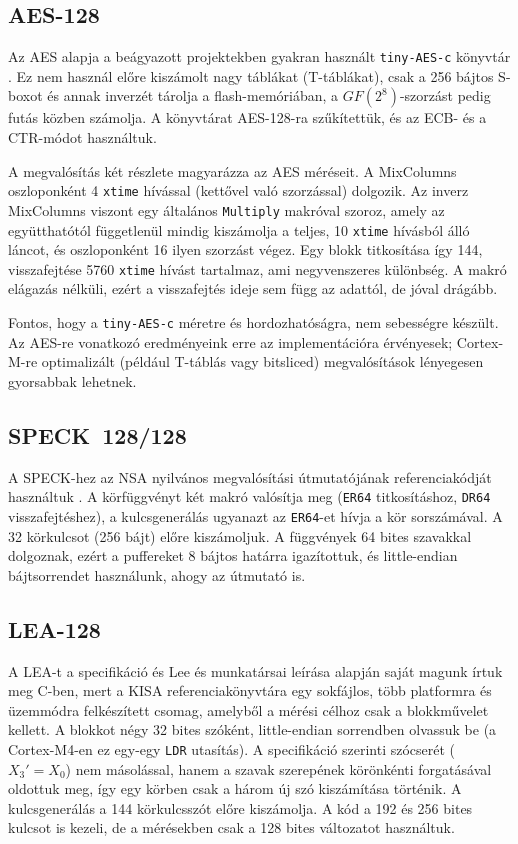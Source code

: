 \documentclass[a4paper,12pt]{report}
\theoremstyle{definition}
\theoremstyle{remark}
\begin{document}
\subsection{AES-128}

Az AES alapja a beágyazott projektekben gyakran használt \texttt{tiny-AES-c} könyvtár \cite{TinyAES}. Ez nem használ előre kiszámolt nagy táblákat (T-táblákat), csak a 256 bájtos S-boxot és annak inverzét tárolja a flash-memóriában, a $GF(2^8)$-szorzást pedig futás közben számolja. A könyvtárat AES-128-ra szűkítettük, és az ECB- és a CTR-módot használtuk.

A megvalósítás két részlete magyarázza az AES méréseit. A MixColumns oszloponként 4 \texttt{xtime} hívással (kettővel való szorzással) dolgozik. Az inverz MixColumns viszont egy általános \texttt{Multiply} makróval szoroz, amely az együtthatótól függetlenül mindig kiszámolja a teljes, 10 \texttt{xtime} hívásból álló láncot, és oszloponként 16 ilyen szorzást végez. Egy blokk titkosítása így 144, visszafejtése 5760 \texttt{xtime} hívást tartalmaz, ami negyvenszeres különbség. A makró elágazás nélküli, ezért a visszafejtés ideje sem függ az adattól, de jóval drágább.

Fontos, hogy a \texttt{tiny-AES-c} méretre és hordozhatóságra, nem sebességre készült. Az AES-re vonatkozó eredményeink erre az implementációra érvényesek; Cortex-M-re optimalizált (például T-táblás vagy bitsliced) megvalósítások lényegesen gyorsabbak lehetnek.

\subsection{SPECK~128/128}

A SPECK-hez az NSA nyilvános megvalósítási útmutatójának referenciakódját használtuk \cite{Beaulieu2019}. A körfüggvényt két makró valósítja meg (\texttt{ER64} titkosításhoz, \texttt{DR64} visszafejtéshez), a kulcsgenerálás ugyanazt az \texttt{ER64}-et hívja a kör sorszámával. A 32 körkulcsot (256 bájt) előre kiszámoljuk. A függvények 64 bites szavakkal dolgoznak, ezért a puffereket 8 bájtos határra igazítottuk, és little-endian bájtsorrendet használunk, ahogy az útmutató is.

\subsection{LEA-128}

A LEA-t a specifikáció \cite{Hong2013} és Lee és munkatársai leírása \cite{Lee2014} alapján saját magunk írtuk meg C-ben, mert a KISA referenciakönyvtára egy sokfájlos, több platformra és üzemmódra felkészített csomag, amelyből a mérési célhoz csak a blokkművelet kellett. A blokkot négy 32 bites szóként, little-endian sorrendben olvassuk be (a Cortex-M4-en ez egy-egy \texttt{LDR} utasítás). A specifikáció szerinti szócserét ($X_3' = X_0$) nem másolással, hanem a szavak szerepének körönkénti forgatásával oldottuk meg, így egy körben csak a három új szó kiszámítása történik. A kulcsgenerálás a 144 körkulcsszót előre kiszámolja. A kód a 192 és 256 bites kulcsot is kezeli, de a mérésekben csak a 128 bites változatot használtuk.
\end{document}
